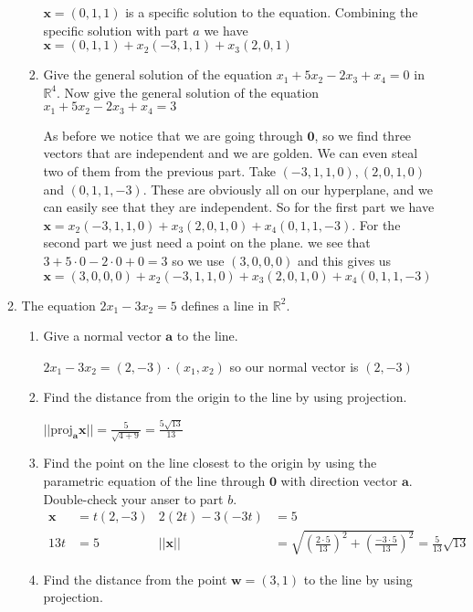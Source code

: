\documentclass[letterpaper]{article}
\begin{document}
\begin{enumerate}
\begin{enumerate}
\begin{enumerate}
      $\mathbf{x}=(0,1,1)$ is a specific solution to the equation. Combining the specific solution with part $a$ we have $\mathbf{x}=(0,1,1)+x_2(-3,1,1)+x_3(2,0,1)$
    \item
      Give the general solution of the equation $x_1+5x_2-2x_3+x_4=0$ in $\mathbb{R}^4$. Now give the general solution of the equation $x_1+5x_2-2x_3+x_4=3$
      
      As before we notice that we are going through $\mathbf{0}$, so we find three vectors that are independent and we are golden. We can even steal two of them from the previous part. Take $(-3,1,1,0), (2,0,1,0)$ and $(0,1,1,-3)$. These are obviously all on our hyperplane, and we can easily see that they are independent. So for the first part we have $\mathbf{x}=x_2(-3,1,1,0)+x_3(2,0,1,0)+x_4(0,1,1,-3)$. For the second part we just need a point on the plane. we see that $3+5\cdot0-2\cdot0+0=3$ so we use $(3,0,0,0)$ and this gives us $\mathbf{x}=(3,0,0,0)+x_2(-3,1,1,0)+x_3(2,0,1,0)+x_4(0,1,1,-3)$
    \end{enumerate}
  \item
    The equation $2x_1-3x_2=5$ defines a line in $\mathbb{R}^2$.
    \begin{enumerate}
    \item
      Give a normal vector $\mathbf{a}$ to the line.

      $2x_1-3x_2=(2,-3)\cdot(x_1,x_2)$ so our normal vector is $(2,-3)$
    \item
      Find the distance from the origin to the line by using projection.

      $||\text{proj}_\mathbf{a}\mathbf{x}||=\frac{5}{\sqrt{4+9}}=\frac{5\sqrt{13}}{13}$
    \item
      Find the point on the line closest to the origin by using the parametric equation of the line through $\mathbf{0}$ with direction vector $\mathbf{a}$. Double-check your anser to part $b$.
      \begin{align*}
        \mathbf{x}&=t(2,-3)&2(2t)-3(-3t)&=5\\
        13t&=5&
        ||\mathbf{x}||&=\sqrt{\left(\frac{2\cdot5}{13}\right)^2+\left(\frac{-3\cdot5}{13}\right)^2}
        =\frac{5}{13}\sqrt{13}
      \end{align*}
    \item
      Find the distance from the point $\mathbf{w}=(3,1)$ to the line by using projection.


\end{enumerate}
\end{enumerate}
\end{enumerate}
\end{document}
